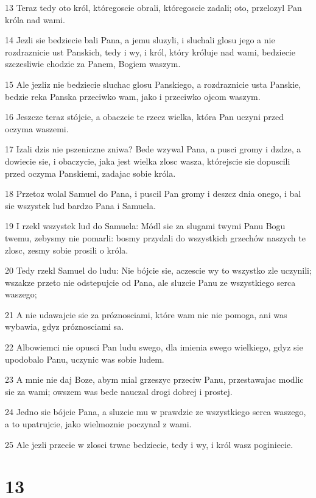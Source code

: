 \par 13 Teraz tedy oto król, któregoscie obrali, któregoscie zadali; oto, przelozyl Pan króla nad wami.
\par 14 Jezli sie bedziecie bali Pana, a jemu sluzyli, i sluchali glosu jego a nie rozdraznicie ust Panskich, tedy i wy, i król, który króluje nad wami, bedziecie szczesliwie chodzic za Panem, Bogiem waszym.
\par 15 Ale jezliz nie bedziecie sluchac glosu Panskiego, a rozdraznicie usta Panskie, bedzie reka Panska przeciwko wam, jako i przeciwko ojcom waszym.
\par 16 Jeszcze teraz stójcie, a obaczcie te rzecz wielka, która Pan uczyni przed oczyma waszemi.
\par 17 Izali dzis nie pszeniczne zniwa? Bede wzywal Pana, a pusci gromy i dzdze, a dowiecie sie, i obaczycie, jaka jest wielka zlosc wasza, którejscie sie dopuscili przed oczyma Panskiemi, zadajac sobie króla.
\par 18 Przetoz wolal Samuel do Pana, i puscil Pan gromy i deszcz dnia onego, i bal sie wszystek lud bardzo Pana i Samuela.
\par 19 I rzekl wszystek lud do Samuela: Módl sie za slugami twymi Panu Bogu twemu, zebysmy nie pomarli: bosmy przydali do wszystkich grzechów naszych te zlosc, zesmy sobie prosili o króla.
\par 20 Tedy rzekl Samuel do ludu: Nie bójcie sie, aczescie wy to wszystko zle uczynili; wszakze przeto nie odstepujcie od Pana, ale sluzcie Panu ze wszystkiego serca waszego;
\par 21 A nie udawajcie sie za próznosciami, które wam nic nie pomoga, ani was wybawia, gdyz próznosciami sa.
\par 22 Albowiemci nie opusci Pan ludu swego, dla imienia swego wielkiego, gdyz sie upodobalo Panu, uczynic was sobie ludem.
\par 23 A mnie nie daj Boze, abym mial grzeszyc przeciw Panu, przestawajac modlic sie za wami; owszem was bede nauczal drogi dobrej i prostej.
\par 24 Jedno sie bójcie Pana, a sluzcie mu w prawdzie ze wszystkiego serca waszego, a to upatrujcie, jako wielmoznie poczynal z wami.
\par 25 Ale jezli przecie w zlosci trwac bedziecie, tedy i wy, i król wasz poginiecie.

\chapter{13}

